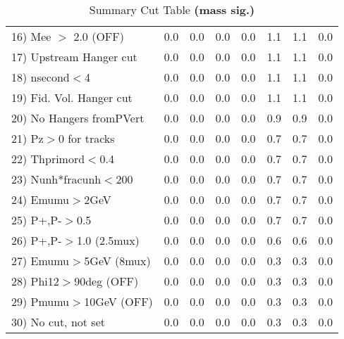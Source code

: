 \begin{table}[h!]
{{\begin{tabular}{||l||r|r|r|r|r||r||r||}
 16) Mee $>$ 2.0  (OFF)   &       0.0 &       0.0 &       0.0 &       0.0 &       1.1 &       1.1 &       0.0 \\
 17) Upstream Hanger cut  &       0.0 &       0.0 &       0.0 &       0.0 &       1.1 &       1.1 &       0.0 \\
 18) nsecond$<$4          &       0.0 &       0.0 &       0.0 &       0.0 &       1.1 &       1.1 &       0.0 \\
 19) Fid. Vol. Hanger cut &       0.0 &       0.0 &       0.0 &       0.0 &       1.1 &       1.1 &       0.0 \\
 20) No Hangers fromPVert &       0.0 &       0.0 &       0.0 &       0.0 &       0.9 &       0.9 &       0.0 \\
 21) Pz$>$0 for tracks    &       0.0 &       0.0 &       0.0 &       0.0 &       0.7 &       0.7 &       0.0 \\
 22) Thprimord$<$0.4      &       0.0 &       0.0 &       0.0 &       0.0 &       0.7 &       0.7 &       0.0 \\
 23) Nunh*fracunh$<$200   &       0.0 &       0.0 &       0.0 &       0.0 &       0.7 &       0.7 &       0.0 \\
 24) Emumu$>$2GeV         &       0.0 &       0.0 &       0.0 &       0.0 &       0.7 &       0.7 &       0.0 \\
 25) P+,P-$>$0.5          &       0.0 &       0.0 &       0.0 &       0.0 &       0.7 &       0.7 &       0.0 \\
 26) P+,P-$>$1.0 (2.5mux) &       0.0 &       0.0 &       0.0 &       0.0 &       0.6 &       0.6 &       0.0 \\
 27) Emumu$>$5GeV  (8mux) &       0.0 &       0.0 &       0.0 &       0.0 &       0.3 &       0.3 &       0.0 \\
 28) Phi12$>$90deg  (OFF) &       0.0 &       0.0 &       0.0 &       0.0 &       0.3 &       0.3 &       0.0 \\
 29) Pmumu$>$10GeV  (OFF) &       0.0 &       0.0 &       0.0 &       0.0 &       0.3 &       0.3 &       0.0 \\
 30) No cut, not set      &       0.0 &       0.0 &       0.0 &       0.0 &       0.3 &       0.3 &       0.0 \\
 \hline
 \hline
 \end{tabular}
 \caption{Summary Cut Table \textbf{ (mass sig.) }}
 \label{tab-sumcut}
 }}
 \end{table}
 \endinput
